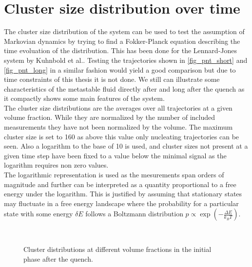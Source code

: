 \section{Cluster size distribution over time}
\label{sec:pnt}
The cluster size distribution of the system can be used to test the assumption of Markovian dynamics by trying to find a Fokker-Planck equation describing the time evoluation of the distribution. This has been done for the Lennard-Jones system by Kuhnbold et al.\cite{Kuhnbold2019}. Testing the trajectories shown in \autoref{fig_pnt_short} and \autoref{fig_pnt_long} in a similar fashion would yield a good comparison but due to time constraints of this thesis it is not done. We still can illustrate some characteristics of the metastable fluid directly after and long after the quench as it compactly shows some main features of the system.\\ 

The cluster size distributions are the averages over all trajectories at a given volume fraction. While they are normalized by the number of included measurements they have not been normalized by the volume. The maximum cluster size is set to 160 as above this value only nucleating trajectories can be seen. Also a logarithm to the base of 10 is used, and cluster sizes not present at a given time step have been fixed to a value below the minimal signal as the logarithm requires non zero values.\\
The logarithmic representation is used as the mesurements span orders of magnitude and further can be interpreted as a quantity proportional to a free energy under the logarithm. This is justified by assuming that stationary states may fluctuate in a free energy landscape where the probability for a particular state with some energy $\delta E$ follows a Boltzmann distribution $p\propto \exp \left( - \frac{\Delta E}{k_B T} \right)$.\\

\begin{figure}[ht]
\begin{center}
 \hspace{0.0cm}
\\
 \hspace{0.0cm}
\caption[Cluster distribution over time after quench]{Cluster distributions at different volume fractions in the initial phase after the quench.}
\label{fig:pnt_short}
\end{center}
\end{figure}

